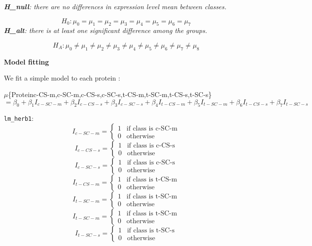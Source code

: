 \documentclass[
]{article}
\begin{document}
\emph{\textbf{H\_null}: there are no differences in expression level
mean between classes.}

\[H_0: \mu_0=\mu_1 = \mu_2 = \mu_3 = \mu_4 = \mu_5 = \mu_6 = \mu_7 \]
\emph{\textbf{H\_alt}: there is at least one significant difference
among the groups.}

\[H_A: \mu_0 \neq \mu_1 \neq \mu_2 \neq \mu_3 \neq \mu_4 \neq \mu_5 \neq \mu_6 \neq \mu_7 \neq \mu_8\]

\textbf{Model fitting}

We fit a simple model to each protein :

\(\mu\)\{Protein\textbar c-CS-m,c-SC-m,c-CS-s,c-SC-s,t-CS-m,t-SC-m,t-CS-s,t-SC-s\}\(=\beta_0 +\beta_1I_{c-SC-m}+\beta_2I_{c-CS-s}+\beta_3I_{c-SC-s}+\beta_4I_{t-CS-m}+\beta_5I_{t-SC-m}+\beta_6I_{t-CS-s}+\beta_7I_{t-SC-s}\)

\texttt{lm\_herb1}: \[ I_{c-SC-m} = \begin{cases} 
          1 & \text{if class is c-SC-m} \\
          0 & \text{otherwise}
       \end{cases}
      \] \[ I_{c-CS-s} = \begin{cases} 
          1 & \text{if class is c-CS-s} \\
          0 & \text{otherwise}
       \end{cases}
      \] \[ I_{c-SC-s} = \begin{cases} 
          1 & \text{if class is c-SC-s} \\
          0 & \text{otherwise}
       \end{cases}
      \] \[ I_{t-CS-m} = \begin{cases} 
          1 & \text{if class is t-CS-m} \\
          0 & \text{otherwise}
       \end{cases}
      \] \[ I_{t-SC-m} = \begin{cases} 
          1 & \text{if class is t-SC-m} \\
          0 & \text{otherwise}
       \end{cases}
      \] \[ I_{t-SC-m} = \begin{cases} 
          1 & \text{if class is t-SC-m} \\
          0 & \text{otherwise}
       \end{cases}
      \] \[ I_{t-SC-s} = \begin{cases} 
          1 & \text{if class is t-SC-s} \\
          0 & \text{otherwise}
       \end{cases}
      \]
\end{document}
